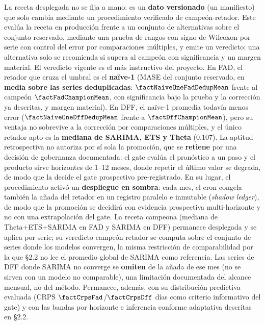 \documentclass[12pt,letterpaper]{report}
\begin{document}
La receta desplegada no se fija a mano: es un \textbf{dato versionado} (un manifiesto) que
solo cambia mediante un procedimiento verificado de campe\'on-retador. Este eval\'ua la receta
en producci\'on frente a un conjunto de alternativas sobre el conjunto reservado, mediante una
prueba de rangos con signo de Wilcoxon por serie con control del error por comparaciones
m\'ultiples, y emite un veredicto: una alternativa solo se recomienda si supera al campe\'on
con significancia y un margen material. El veredicto vigente es el m\'as instructivo del
proyecto. En FAD, el retador que cruza el umbral es el \textbf{na\"ive-1} (MASE del conjunto
reservado, en \textbf{media sobre las series deduplicadas}: $\factNaiveOneFadDedupMean$ frente al
campe\'on $\factFadChampionMean$, con significancia bajo la prueba y la correcci\'on ya descritas, y
margen material). En DFF, el na\"ive-1 promedia todav\'ia menos error ($\factNaiveOneDffDedupMean$
frente a $\factDffChampionMean$), pero su ventaja no sobrevive a la correcci\'on por comparaciones
m\'ultiples, y el \'unico retador apto es la \textbf{mediana de SARIMA, ETS y Theta} ($0.107$). La
aptitud retrospectiva no autoriza por s\'i sola la promoci\'on, que se \textbf{retiene} por una
decisi\'on de gobernanza documentada: el gate eval\'ua el pron\'ostico a un paso y el producto sirve
horizontes de 1--12 meses, donde repetir el \'ultimo valor se degrada, de modo que la decide el gate
prospectivo pre-registrado.
En su lugar, el procedimiento activ\'o un \textbf{despliegue en sombra}: cada mes, el cron
congela tambi\'en la a\~nada del retador en un registro paralelo e inmutable
(\textit{shadow ledger}), de modo que la promoci\'on se decidir\'a con evidencia
prospectiva multi-horizonte y no con una extrapolaci\'on del gate. La receta campeona
(mediana de Theta+ETS+SARIMA en FAD y SARIMA en DFF) permanece desplegada y se aplica por
serie; su veredicto campe\'on-retador se computa sobre el conjunto de series donde los
modelos convergen, la misma restricci\'on de comparabilidad por la que §2.2 no lee el
promedio global de SARIMA como referencia. Las series de DFF donde SARIMA no converge se
\textbf{omiten} de la a\~nada de ese mes (no se sirven con un modelo no comparable), una
limitaci\'on documentada del alcance mensual, no del m\'etodo. Permanece, adem\'as, con su
distribuci\'on predictiva evaluada (CRPS $\factCrpsFad$/$\factCrpsDff$ d\'ias como criterio informativo
del gate) y con las bandas por horizonte e inferencia conforme adaptativa descritas en
§2.2.
\end{document}
